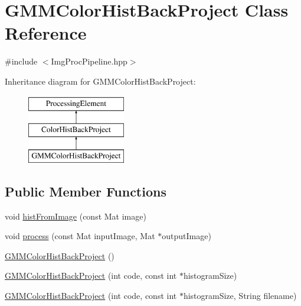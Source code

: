 \hypertarget{classGMMColorHistBackProject}{\section{\-G\-M\-M\-Color\-Hist\-Back\-Project \-Class \-Reference}
\label{classGMMColorHistBackProject}
}


{\ttfamily \#include $<$\-Img\-Proc\-Pipeline.\-hpp$>$}

\-Inheritance diagram for \-G\-M\-M\-Color\-Hist\-Back\-Project\-:\begin{figure}[H]
\begin{center}
\leavevmode
\includegraphics[height=3.000000cm]{classGMMColorHistBackProject}
\end{center}
\end{figure}
\subsection*{\-Public \-Member \-Functions}
\begin{DoxyCompactItemize}
\item 
void \hyperlink{classGMMColorHistBackProject_aa52c626599ec2dc46fd5dbe7d0aab11a}{hist\-From\-Image} (const \-Mat image)
\item 
void \hyperlink{classGMMColorHistBackProject_aee0c6ee3a5f9fa9a8b66590cb9ba5c8a}{process} (const \-Mat input\-Image, \-Mat $\ast$output\-Image)
\item 
\hyperlink{classGMMColorHistBackProject_a4c53b4eb022841963e676e9450e71d84}{\-G\-M\-M\-Color\-Hist\-Back\-Project} ()
\item 
\hyperlink{classGMMColorHistBackProject_a8339a9703a4f3d2f4df946ca248043da}{\-G\-M\-M\-Color\-Hist\-Back\-Project} (int code, const int $\ast$histogram\-Size)
\item 
\hyperlink{classGMMColorHistBackProject_aa6ae4c3c4144ec19f684810c0e278fe3}{\-G\-M\-M\-Color\-Hist\-Back\-Project} (int code, const int $\ast$histogram\-Size, \-String filename)
\end{DoxyCompactItemize}


